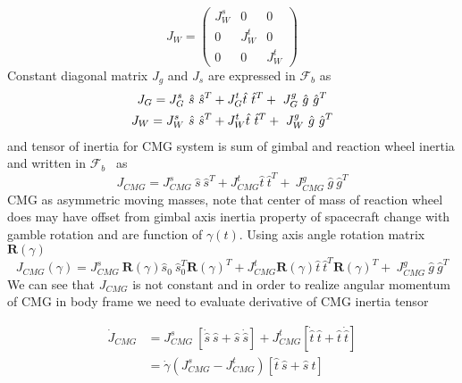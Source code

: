 \begin{equation}
J_{W} =\begin{pmatrix}
J^{s}_{W} & 0 & 0\\
0 & J^{t}_{W} & 0\\
0 & 0 & J^{t}_{W}
\end{pmatrix}
\end{equation}
Constant diagonal matrix $\displaystyle J_{g}$ and $\displaystyle J_{s}$ are expressed in $\displaystyle \mathcal{F}_{b}$ as
\begin{gather}
J_{G} =J^{s}_{G} \ \hat{s} \ \hat{s}^{T} +J^{t}_{G}\hat{t} \ \hat{t}^{T} +\ J^{g}_{G} \ \hat{g} \ \hat{g}^{T}\\
J_{W} =J^{s}_{W} \ \hat{s} \ \hat{s}^{T} +J^{t}_{W}\hat{t} \ \hat{t}^{T} +\ J^{g}_{W} \ \hat{g} \ \hat{g}^{T} \notag
\end{gather}
and tensor of inertia for CMG system is sum of gimbal and reaction wheel inertia and written in $\displaystyle \mathcal{F}_{b}$ \ as
\begin{equation}
J_{CMG} =J^{s}_{CMG} \ \hat{s} \ \hat{s}^{T} +J^{t}_{CMG}\hat{t} \ \hat{t}^{T} +\ J^{g}_{CMG} \ \hat{g} \ \hat{g}^{T}
\end{equation}
CMG as asymmetric moving masses, note that center of mass of reaction wheel does may have offset from gimbal axis inertia property of spacecraft change with gamble rotation and are function of $\displaystyle \gamma ( t)$. Using axis angle rotation matrix $\displaystyle \mathbf{R}( \gamma )$
\begin{equation}
J_{CMG}( \gamma ) =J^{s}_{CMG} \ \mathbf{R}( \gamma )\hat{s}_{0} \ \hat{s}^{T}_{0}\mathbf{R}( \gamma )^{T} +J^{t}_{CMG}\mathbf{R}( \gamma )\hat{t} \ \hat{t}^{T}\mathbf{R}( \gamma )^{T} +\ J^{g}_{CMG} \ \hat{g} \ \hat{g}^{T}
\end{equation}
We can see that $\displaystyle J_{CMG}$ is not constant and in order to realize angular momentum of CMG in body frame we need to evaluate derivative of CMG inertia tensor

\begin{equation}
\begin{aligned}
\dot{J}_{CMG} & =J^{s}_{CMG} \ \left[\dot{\hat{s}} \ \hat{s} +\hat{s} \ \dot{\hat{s}}\right] +J^{t}_{CMG}\left[\dot{\hat{t}} \ \hat{t} +\hat{t} \ \dot{\hat{t}}\right]\\
 & =\dot{\gamma }\left( J^{s}_{CMG} -J^{t}_{CMG}\right)[\hat{t} \ \hat{s} +\hat{s} \ \hat{t}]
\end{aligned}
\label{eqn:Jcmg_dot}
\end{equation}


